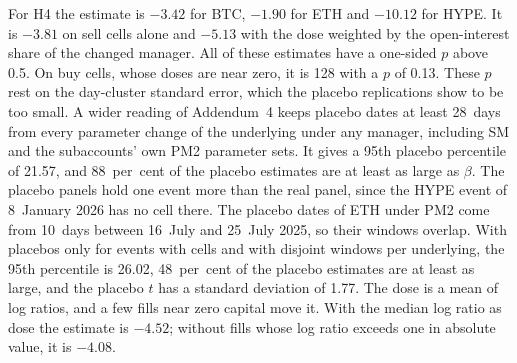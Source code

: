 \documentclass[a4paper,fleqn]{cas-dc}
\begin{document}
For H4 the estimate is $-3.42$ for BTC, $-1.90$ for ETH and $-10.12$ for HYPE. It is $-3.81$ on sell cells alone
and $-5.13$ with the dose weighted by the open-interest share of the changed manager. All of these estimates have
a one-sided $p$ above 0.5. On buy cells, whose doses are near zero, it is 128 with a $p$ of 0.13. These $p$ rest
on the day-cluster standard error, which the placebo replications show to be too small. A wider reading of Addendum~4
keeps placebo dates at least 28~days from every parameter change of the underlying under any manager, including SM
and the subaccounts' own PM2 parameter sets. It gives a 95th placebo percentile of 21.57, and 88~per~cent of the
placebo estimates are at least as large as $\beta$. The placebo panels hold one event more than the real panel,
since the HYPE event of 8~January 2026 has no cell there. The placebo dates of ETH under PM2 come from 10~days
between 16~July and 25~July 2025, so their windows overlap. With placebos only for events with cells and with
disjoint windows per underlying, the 95th percentile is 26.02, 48~per~cent of the placebo estimates are at least
as large, and the placebo $t$ has a standard deviation of 1.77. The dose is a mean of log ratios, and a few fills
near zero capital move it. With the median log ratio as dose the estimate is $-4.52$; without fills whose log
ratio exceeds one in absolute value, it is $-4.08$.
\end{document}
